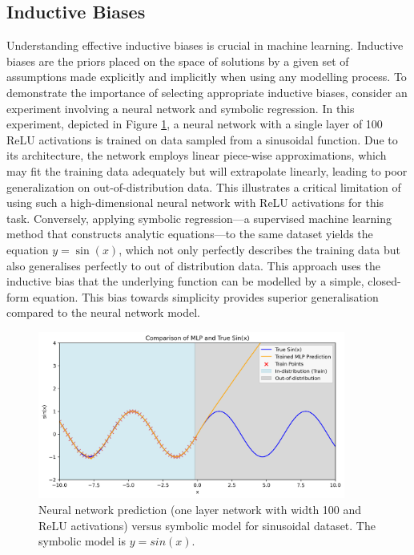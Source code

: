 \documentclass[11pt]{article}
\begin{document}
\subsection{Inductive Biases}
Understanding effective inductive biases is crucial in machine learning. Inductive biases are the priors placed on the space of solutions by a given set of assumptions made explicitly and implicitly when using any modelling process. To demonstrate the importance of selecting appropriate inductive biases, consider an experiment involving a neural network and symbolic regression. In this experiment, depicted in Figure \ref{fig:nn_vs_sym_sin}, a neural network with a single layer of 100 ReLU activations is trained on data sampled from a sinusoidal function. Due to its architecture, the network employs linear piece-wise approximations, which may fit the training data adequately but will extrapolate linearly, leading to poor generalization on out-of-distribution data. This illustrates a critical limitation of using such a high-dimensional neural network with ReLU activations for this task. Conversely, applying symbolic regression---a supervised machine learning method that constructs analytic equations---to the same dataset yields the equation \(y = \sin(x)\), which not only perfectly describes the training data but also generalises perfectly to out of distribution data. This approach uses the inductive bias that the underlying function can be modelled by a simple, closed-form equation. This bias towards simplicity provides superior generalisation compared to the neural network model.


\begin{figure}[H]
    \centering
    \includegraphics[width=0.9\textwidth]{figs/analytic_vs_nn_inductive_bias.png}
    \caption{Neural network prediction (one layer network with width 100 and ReLU activations)  versus symbolic model for sinusoidal dataset. The symbolic model is $y = sin(x)$.}
    \label{fig:nn_vs_sym_sin}
\end{figure}
\end{document}
